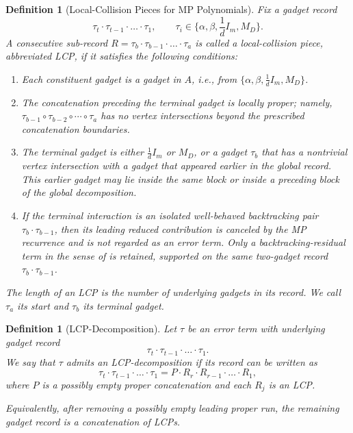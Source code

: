 \documentclass[12pt]{article}
\newtheorem{definition}[theorem]{Definition}
\begin{document}
\begin{definition}[Local-Collision Pieces for MP Polynomials]
\label{def:local-collision-pieces}
Fix a gadget record
\[
    \tau_t\cdot\tau_{t-1}\cdot\dots\cdot\tau_1,
    \qquad
    \tau_i\in\{\alpha,\beta, \frac{1}{d} I_m, M_D\}.
\]
A consecutive sub-record
\(
    R
    =
    \tau_b\cdot\tau_{b-1}\cdot\dots\cdot\tau_a
\)
is called a \emph{local-collision piece}, abbreviated \emph{LCP}, if it
satisfies the following conditions:
\begin{enumerate}
    \item Each constituent gadget is a gadget in $A$, i.e., from $\{\alpha,\beta, \frac{1}{d} I_m, M_D\}$.

    \item The concatenation preceding the terminal gadget is locally
    proper; namely,
    \(
        \tau_{b-1}\circ\tau_{b-2}\circ\cdots\circ\tau_a
    \)
    has no vertex intersections beyond the prescribed concatenation
    boundaries.

    \item The terminal gadget is either $\frac{1}{d}I_m $ or $M_D$, or a gadget \(\tau_b\) that has a nontrivial vertex
    intersection with a gadget that appeared earlier in the global record.
    This earlier gadget may lie inside the same block or inside a preceding
    block of the global decomposition.

    \item If the terminal interaction is an isolated well-behaved
    backtracking pair
    \(\tau_b\cdot\tau_{b-1}\), then its leading reduced contribution is
    canceled by the MP recurrence and is not regarded as an error term.
    Only a backtracking-residual term in the sense of
     is retained, supported on the same
    two-gadget record
    \(\tau_b\cdot\tau_{b-1}\).
\end{enumerate}
The length of an LCP is the number of underlying gadgets in its record.
We call \(\tau_a\) its start and \(\tau_b\) its terminal gadget. 
\end{definition}

\begin{definition}[LCP-Decomposition]
\label{def:lcp-decomposition}
Let \(\tau\) be an error term with underlying gadget record
\[
    \tau_t\cdot\tau_{t-1}\cdot\dots\cdot\tau_1.
\]
We say that \(\tau\) admits an \emph{LCP-decomposition} if its record can
be written as
\[
    \tau_t\cdot\tau_{t-1}\cdot\dots\cdot\tau_1
    =
    P\cdot R_r\cdot R_{r-1}\cdot\dots\cdot R_1,
\]
where \(P\) is a possibly empty proper concatenation and each \(R_j\) is
an LCP.

Equivalently, after removing a possibly empty leading proper run, the
remaining gadget record is a concatenation of LCPs.
\end{definition}
\end{document}
